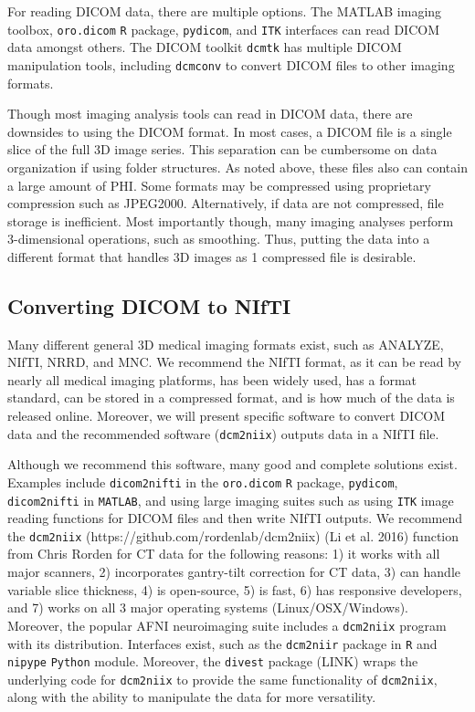 \documentclass[]{elsarticle} %
\begin{document}
For reading DICOM data, there are multiple options. The MATLAB imaging
toolbox, \texttt{oro.dicom} \texttt{R} package, \texttt{pydicom}, and
\texttt{ITK} interfaces can read DICOM data amongst others. The DICOM
toolkit \texttt{dcmtk} has multiple DICOM manipulation tools, including
\texttt{dcmconv} to convert DICOM files to other imaging formats.

Though most imaging analysis tools can read in DICOM data, there are
downsides to using the DICOM format. In most cases, a DICOM file is a
single slice of the full 3D image series. This separation can be
cumbersome on data organization if using folder structures. As noted
above, these files also can contain a large amount of PHI. Some formats
may be compressed using proprietary compression such as JPEG2000.
Alternatively, if data are not compressed, file storage is inefficient.
Most importantly though, many imaging analyses perform 3-dimensional
operations, such as smoothing. Thus, putting the data into a different
format that handles 3D images as 1 compressed file is desirable.

\hypertarget{converting-dicom-to-nifti}{%
\subsection{Converting DICOM to NIfTI}\label{converting-dicom-to-nifti}}

Many different general 3D medical imaging formats exist, such as
ANALYZE, NIfTI, NRRD, and MNC. We recommend the NIfTI format, as it can
be read by nearly all medical imaging platforms, has been widely used,
has a format standard, can be stored in a compressed format, and is how
much of the data is released online. Moreover, we will present specific
software to convert DICOM data and the recommended software
(\texttt{dcm2niix}) outputs data in a NIfTI file.

Although we recommend this software, many good and complete solutions
exist. Examples include \texttt{dicom2nifti} in the \texttt{oro.dicom}
\texttt{R} package, \texttt{pydicom}, \texttt{dicom2nifti} in
\texttt{MATLAB}, and using large imaging suites such as using
\texttt{ITK} image reading functions for DICOM files and then write
NIfTI outputs. We recommend the \texttt{dcm2niix}
(https://github.com/rordenlab/dcm2niix) (Li et al. 2016) function from
Chris Rorden for CT data for the following reasons: 1) it works with all
major scanners, 2) incorporates gantry-tilt correction for CT data, 3)
can handle variable slice thickness, 4) is open-source, 5) is fast, 6)
has responsive developers, and 7) works on all 3 major operating systems
(Linux/OSX/Windows). Moreover, the popular AFNI neuroimaging suite
includes a \texttt{dcm2niix} program with its distribution. Interfaces
exist, such as the \texttt{dcm2niir} package in \texttt{R} and
\texttt{nipype} \texttt{Python} module. Moreover, the \texttt{divest}
package (LINK) wraps the underlying code for \texttt{dcm2niix} to
provide the same functionality of \texttt{dcm2niix}, along with the
ability to manipulate the data for more versatility.
\end{document}

